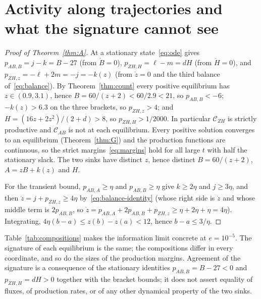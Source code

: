 \documentclass[11pt,a4paper]{article}
\theoremstyle{plain}
\theoremstyle{definition}
\theoremstyle{remark}
\newcommand{\cAB}{\mathcal{C}_{AB}}
\newcommand{\cZH}{\mathcal{C}_{ZH}}
\begin{document}
\section{Activity along trajectories and what the signature cannot see}\label{sec:activity}

\begin{proof}[Proof of Theorem~\ref{thm:A}]
At a stationary state~\eqref{eq:ode} gives $p_{AB,B}=j-k=B-27$ (from $\dot B=0$), $p_{ZH,H}=\ell-m=dH$ (from $\dot H=0$), and $p_{ZH,z}=-\ell+2m=-j=-k(z)$ (from $\dot z=0$ and the third balance of~\eqref{eq:balance}). By Theorem~\ref{thm:count} every positive equilibrium has $z\in(0.9,3.1)$, hence $B=60/(z+2)<60/2.9<21$, so $p_{AB,B}<-6$; $-k(z)>6.3$ on the three brackets, so $p_{ZH,z}>4$; and $H=(16z+2z^2)/(2+d)>8$, so $p_{ZH,H}>1/2000$. In particular $\cZH$ is strictly productive and $\cAB$ is not at each equilibrium. Every positive solution converges to an equilibrium (Theorem~\ref{thm:G}) and the production functions are continuous, so the strict margins~\eqref{eq:margins} hold for all large $t$ with half the stationary slack. The two sinks have distinct $z$, hence distinct $B=60/(z+2)$, $A=zB+k(z)$ and $H$.

For the transient bound, $p_{AB,A}\ge\eta$ and $p_{AB,B}\ge\eta$ give $k\ge2\eta$ and $j\ge3\eta$, and then $\dot z=j+p_{ZH,z}\ge4\eta$ by~\eqref{eq:balance-identity} (whose right side is $\dot z$ and whose middle term is $2p_{AB,B}$, so $\dot z=p_{AB,A}+2p_{AB,B}+p_{ZH,z}\ge\eta+2\eta+\eta=4\eta$). Integrating, $4\eta(b-a)\le z(b)-z(a)<12$, hence $b-a\le3/\eta$.
\end{proof}

Table~\ref{tab:compositions} makes the information limit concrete at $e=10^{-5}$. The signature of each equilibrium is the same; the compositions differ in every coordinate, and so do the sizes of the production margins. Agreement of the signature is a consequence of the stationary identities $p_{AB,B}=B-27<0$ and $p_{ZH,H}=dH>0$ together with the bracket bounds; it does not assert equality of fluxes, of production rates, or of any other dynamical property of the two sinks.
\end{document}
